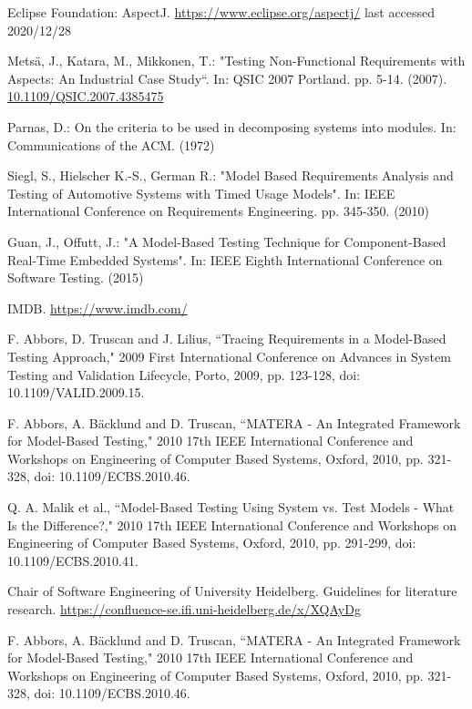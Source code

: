 \documentclass[a4paper,10pt, bibliography=totocnumbered]{scrreprt}
\begin{document}
\begin{thebibliography}{9}
 Eclipse Foundation: AspectJ.
\url{https://www.eclipse.org/aspectj/}  last accessed 2020/12/28

 Metsä, J., Katara, M., Mikkonen, T.: "Testing Non-Functional Requirements with Aspects: An Industrial Case Study“.
In:  QSIC 2007 Portland. pp. 5-14. (2007). \url{10.1109/QSIC.2007.4385475}

 Parnas, D.: On the criteria to be used in decomposing systems into modules.
In: Communications of the ACM. (1972)



 Siegl, S., Hielscher K.-S., German R.: "Model Based Requirements Analysis and Testing of Automotive Systems with Timed Usage Models". In: IEEE International Conference on Requirements Engineering. pp. 345-350. (2010)

 Guan, J., Offutt, J.: "A Model-Based Testing Technique for Component-Based Real-Time Embedded Systems". In: IEEE Eighth International Conference on Software Testing. (2015)

 IMDB. \url{https://www.imdb.com/}





 F. Abbors, D. Truscan and J. Lilius, “Tracing Requirements in a Model-Based Testing Approach," 2009 First International Conference on Advances in System Testing and Validation Lifecycle, Porto, 2009, pp. 123-128, doi: 10.1109/VALID.2009.15.

 F. Abbors, A. Bäcklund and D. Truscan, “MATERA - An Integrated Framework for Model-Based Testing," 2010 17th IEEE International Conference and Workshops on Engineering of Computer Based Systems, Oxford, 2010, pp. 321-328, doi: 10.1109/ECBS.2010.46.

 Q. A. Malik et al., “Model-Based Testing Using System vs. Test Models - What Is the Difference?," 2010 17th IEEE International Conference and Workshops on Engineering of Computer Based Systems, Oxford, 2010, pp. 291-299, doi: 10.1109/ECBS.2010.41.

 Chair of Software Engineering of University Heidelberg. Guidelines for literature research.
\url{https://confluence-se.ifi.uni-heidelberg.de/x/XQAyDg}

 F. Abbors, A. Bäcklund and D. Truscan, “MATERA - An Integrated Framework for Model-Based Testing," 2010 17th IEEE International Conference and Workshops on Engineering of Computer Based Systems, Oxford, 2010, pp. 321-328, doi: 10.1109/ECBS.2010.46.


\end{thebibliography}
\end{document}
